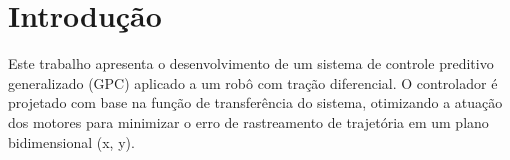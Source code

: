 \section{Introdução}

Este trabalho apresenta o desenvolvimento de 
um sistema de controle preditivo generalizado (GPC)
 aplicado a um robô com tração diferencial. 
O controlador é projetado com base na função de transferência do sistema, 
otimizando a atuação dos motores para minimizar o erro de rastreamento 
de trajetória em um plano bidimensional (x, y). 

